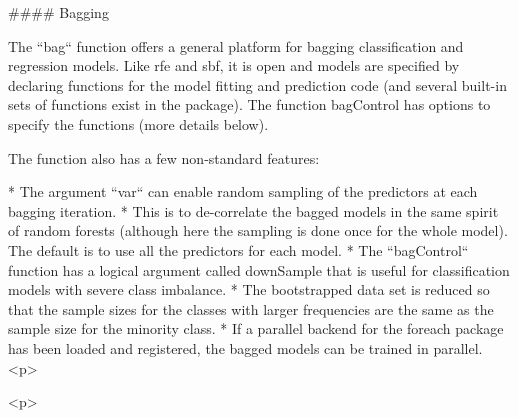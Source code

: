 

#### Bagging

The ``bag`` function offers a general platform for bagging classification and regression models. 
Like rfe and sbf, it is open and models are specified by declaring functions for the model fitting and prediction code (and several built-in sets of functions exist in the package). The function bagControl has options to specify the functions (more details below).

The function also has a few non-standard features:


* The argument ``var`` can enable random sampling of the predictors at each bagging iteration. 
* This is to de-correlate the bagged models in the same spirit of random forests (although here the sampling is done once for the whole model). The default is to use all the predictors for each model.
* The ``bagControl`` function has a logical argument called downSample that is useful for classification models with severe class imbalance. 
* The bootstrapped data set is reduced so that the sample sizes for the classes with larger frequencies are the same as the sample size for the minority class.
* If a parallel backend for the foreach package has been loaded and registered, the bagged models can be trained in parallel.
<p>

<p>
